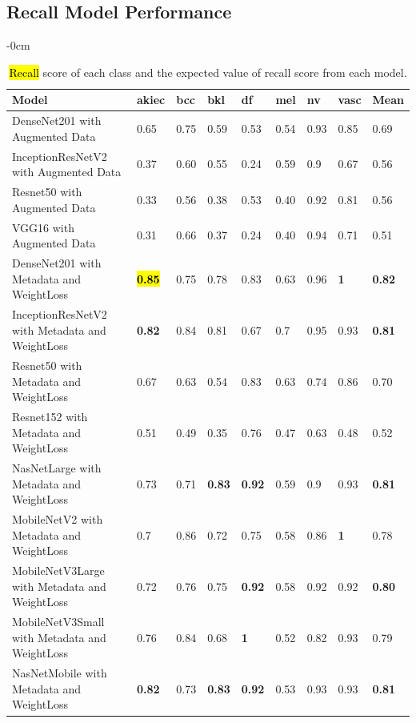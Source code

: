 \documentclass[sensors,article,accept,pdftex,moreauthors]{Definitions/mdpi}
\begin{document}
		
		\subsection[\appendixname~\thesection]{Recall Model Performance}
		\begin{table}[H]
\caption{\hl{Recall%
} score of each class and the expected value of recall score from each model.}
\label{appendix-table:recall-score-summary}

\begin{adjustwidth}{-\extralength}{0cm}
\centering
\begin{tabular}{p{9cm}  p{0.8cm}  p{0.8cm}  p{0.6cm}  p{0.6cm}  p{0.6cm}  p{0.6cm}  p{0.8cm}  p{0.9cm}} 
	\toprule
	\textbf{Model} & \textbf{akiec} & \textbf{bcc} & \textbf{bkl} & \textbf{df} & \textbf{mel} & \textbf{nv} & \textbf{vasc} & \textbf{Mean} \\
	\midrule
	DenseNet201 with Augmented Data & 0.65 & 0.75 & 0.59 & 0.53 & 0.54 & 0.93 & 0.85 & 0.69\\ 
	\midrule
	InceptionResNetV2 with Augmented Data & 0.37 & 0.60 & 0.55 & 0.24 & 0.59 & 0.9 & 0.67 & 0.56\\
	\midrule
	Resnet50 with Augmented Data & 0.33 & 0.56 & 0.38 & 0.53 & 0.40 & 0.92 & 0.81 & 0.56\\
	\midrule 	
	VGG16 with Augmented Data & 0.31 & 0.66 & 0.37 & 0.24 & 0.40 & 0.94 & 0.71 & 0.51\\ 
	\midrule		
	DenseNet201 with Metadata and WeightLoss & \textbf{\hl{0.85}} & 0.75 & 0.78 & 0.83 & 0.63 & 0.96 & \textbf{1} & \textbf{0.82}\\
	\midrule
	InceptionResNetV2 with Metadata and WeightLoss & \textbf{0.82} & 0.84 & 0.81 & 0.67 & 0.7 & 0.95 & 0.93 & \textbf{0.81}\\
	\midrule
	Resnet50 with Metadata and WeightLoss & 0.67 & 0.63 & 0.54 & 0.83 & 0.63 & 0.74 & 0.86 & 0.70\\
	\midrule
	Resnet152 with Metadata and WeightLoss & 0.51 & 0.49 & 0.35 & 0.76 & 0.47 & 0.63 & 0.48 & 0.52\\
	\midrule
	NasNetLarge with Metadata and WeightLoss & 0.73 & 0.71 & \textbf{0.83} & \textbf{0.92} & 0.59 & 0.9 & 0.93 & \textbf{0.81}\\
	\midrule
	MobileNetV2 with Metadata and WeightLoss & 0.7 & 0.86 & 0.72 & 0.75 & 0.58 & 0.86 & \textbf{1} & 0.78\\
	\midrule
	MobileNetV3Large with Metadata and WeightLoss & 0.72 & 0.76 & 0.75 & \textbf{0.92} & 0.58 & 0.92 & 0.92 & \textbf{0.80}\\
	\midrule
	MobileNetV3Small with Metadata and WeightLoss & 0.76 & 0.84 & 0.68 & \textbf{1} & 0.52 & 0.82 & 0.93 & 0.79\\
	\midrule
	NasNetMobile with Metadata and WeightLoss & \textbf{0.82} & 0.73 & \textbf{0.83} & \textbf{0.92} & 0.53 & 0.93 & 0.93 & \textbf{0.81}\\
	\bottomrule
\end{tabular}
\end{adjustwidth}
		\end{table}
		
\end{document}
